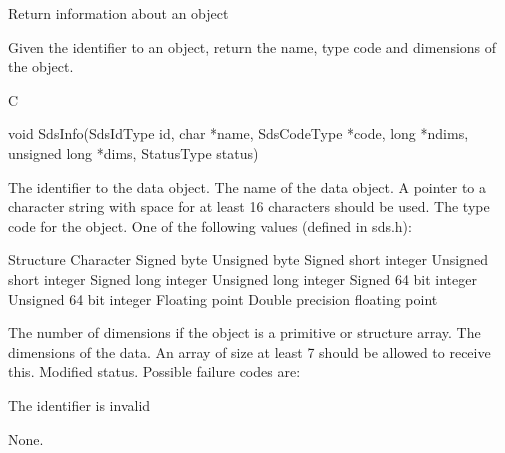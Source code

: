 \begin{manroutinedescription}
      Return information about an object

      Given the identifier to an object, return the name, type code and
      dimensions of the object.
 
      C

      void SdsInfo(SdsIdType id, char *name, SdsCodeType *code, long *ndims,
               unsigned long *dims, StatusType {\mantt{*}} {} %
status)
 
\begin{manparametertable}
 The identifier to the data %
object.
 The name of the data object. A %
pointer to a
                            character string with space for at least
                            16 characters should be used.
 The type code for the %
object. One of
                            the following values (defined in sds.h):
\end{manparametertable}
\begin{mantwocolumntable}
Structure
Character
Signed byte
Unsigned byte
Signed short integer
Unsigned short integer
Signed long integer
Unsigned long integer
Signed 64 bit integer
Unsigned 64 bit integer
Floating point
Double precision floating point
\end{mantwocolumntable}
\begin{manparametertable}
 The number of dimensions if the %
object
                            is a primitive or structure array.
 The dimensions of the %
data. An array of
                            size at least 7 should be allowed to receive this.
 Modified status. Possible %
failure codes are:
\end{manparametertable}
\begin{mantwocolumntable}
The identifier is invalid
\end{mantwocolumntable}
      None.

\end{manroutinedescription}
